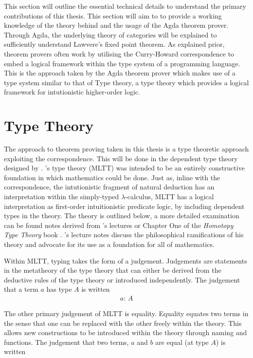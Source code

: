 This section will outline the essential technical details to understand the
primary contributions of this thesis. This section will aim to to provide a
working knowledge of the theory behind and the usage of the Agda theorem prover.
Through Agda, the underlying theory of categories will be explained to
sufficiently understand Lawvere's fixed point theorem. As explained prior,
theorem provers often work by utilising the Curry-Howard correspondence to embed a
logical framework within the type system of a programming language. This is the
approach taken by the Agda theorem prover which makes use of a type system
similar to that of \mlt{} Type theory, a type theory which provides a
logical framework for intutionistic higher-order logic.

\section{\mlt{} Type Theory}
\label{section:mlt}
The approach to theorem proving taken in this thesis is a type theoretic
approach exploiting the \cuho{} correspondence. This will be done in the
dependent type theory designed by \mlt{}. \mlt{}'s type theory (MLTT) was intended to be an
entirely constructive foundation in which mathematics could be done. Just as,
inline with the \cuho{} correspondence, the intutionistic fragment of
natural deduction has an interpretation within the simply-typed
$\lambda$-calculus, MLTT has a logical interpretation as first-order
intuitionistic predicate logic, by including dependent types in the theory. The
theory is outlined below, a more detailed examination can be found notes derived
from \mlt's lectures \cite{martin1984intuitionistic} or Chapter One of the
\textit{Homotopy Type Theory} book \cite{hottbook}. \mlt's lecture notes
discuss the philosophical ramifications of his theory and advocate for its use
as a foundation for all of mathematics.

Within MLTT, typing takes the form of a judgement. Judgements are statements in
the metatheory of the type theory that can either be derived from the deductive
rules of the type theory or introduced independently. The judgement that a term
$a$ has type $A$ is written
\begin{align*}
    a: \, A
\end{align*}

The other primary judgement of MLTT is equality. Equality equates
two terms in the sense that one can be replaced with the other freely within the
theory. This allows new constructions to be introduced within the theory through
naming and functions. The judgement that
two terms, $a$ and $b$ are equal (at type $A$) is written

